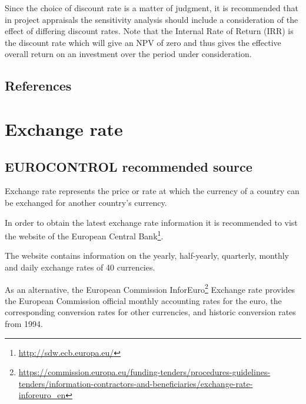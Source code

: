 \documentclass[
  11pt,
  a4paper,
]{book}
\DeclareRobustCommand{\href}[2]{#2\footnote{\url{#1}}}
\begin{document}
Since the choice of discount rate is a matter of judgment, it is
recommended that in project appraisals the sensitivity analysis should
include a consideration of the effect of differing discount rates. Note
that the Internal Rate of Return (IRR) is the discount rate which will
give an NPV of zero and thus gives the effective overall return on an
investment over the period under consideration.

\hypertarget{references-40}{%
\section{References}\label{references-40}}

\hypertarget{sec-exchange-rate}{%
\chapter{Exchange rate}\label{sec-exchange-rate}}

\hypertarget{eurocontrol-recommended-source}{%
\section{EUROCONTROL recommended
source}\label{eurocontrol-recommended-source}}

Exchange rate represents the price or rate at which the currency of a
country can be exchanged for another country's currency.

In order to obtain the latest exchange rate information it is
recommended to vist the website of the
\href{http://sdw.ecb.europa.eu/}{European Central Bank}.

The website contains information on the yearly, half-yearly, quarterly,
monthly and daily exchange rates of 40 currencies.

As an alternative, the European Commission
\href{https://commission.europa.eu/funding-tenders/procedures-guidelines-tenders/information-contractors-and-beneficiaries/exchange-rate-inforeuro_en}{InforEuro}
Exchange rate provides the European Commission official monthly
accounting rates for the euro, the corresponding conversion rates for
other currencies, and historic conversion rates from 1994.
\end{document}
